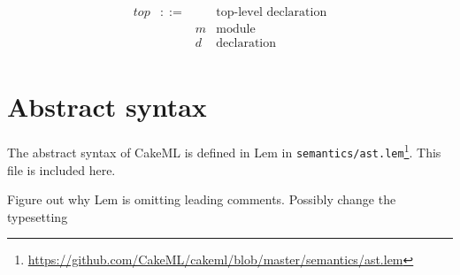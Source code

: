 \documentclass[12pt,a4paper]{book}
\newcommand{\TODO}[1]{{\color{red}#1}}
\begin{document}
\[
\begin{array}{lcll}
\mathit{top} &::=& &\mbox{top-level declaration}\\
&& m &\mbox{module}\\
&& d &\mbox{declaration}\\
\end{array}
\]



\section{Abstract syntax}

The abstract syntax of CakeML is defined in Lem in \texttt{semantics/ast.lem}\footnote{\url{https://github.com/CakeML/cakeml/blob/master/semantics/ast.lem}}. This file is included here.

{\setlength{\parindent}{0pt}
\TODO{Figure out why Lem is omitting leading comments. Possibly change the typesetting}


\LEMTypeLit

\LEMTypeOpn

\LEMTypeOpb

\LEMTypeModN

\LEMTypeId

\LEMTypeVarN

\LEMTypeConN

\LEMTypeTypeN

\LEMTypeTvarN

\LEMValspecMkId

\LEMmkId

\LEMValspecIdToN

\LEMidToN

\LEMTypeOp

\LEMTypeLop

\LEMTypeTctor

\LEMTypeT

\LEMTint

\LEMTstring

\LEMTunit

\LEMTbool

\LEMTref

\LEMTwordEight

\LEMTwordEightarray

\LEMTfn

\LEMTexn

\LEMTypePat

\LEMTypeExp

\LEMTypeTypeDef

\LEMTypeDec

\LEMTypeDecs

\LEMTypeSpec

\LEMTypeSpecs

\LEMTypeTop

\LEMTypeProg

\LEMValspecPatBindings

\LEMconstZero
}
\end{document}
